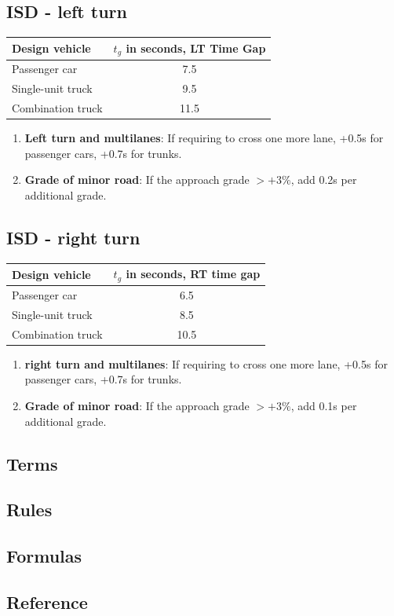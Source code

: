 \documentclass{article}
\begin{document}
  \subsection{ISD - left turn}
  \begin{tabular}{|l|c|}
    \hline
    \textbf{Design vehicle} & \textbf{$t_g$ in seconds, LT Time Gap} \\
    \hline
    Passenger car & 7.5 \\
    \hline
    Single-unit truck & 9.5 \\
    \hline
    Combination truck & 11.5 \\
    \hline
  \end{tabular}

  \begin{enumerate}
    \item \textbf{Left turn and multilanes}: If requiring to cross one more lane, +0.5s for passenger cars, +0.7s for trunks.
    \item \textbf{Grade of minor road}: If the approach grade $> +3\%$, add 0.2s per additional grade.
  \end{enumerate}

  \subsection{ISD - right turn}
  \begin{tabular}{|l|c|}
  \hline
  \textbf{Design vehicle} & \textbf{$t_g$ in seconds, RT time gap}\\
  \hline
  Passenger car & 6.5 \\
  \hline
  Single-unit truck & 8.5 \\
  \hline
  Combination truck & 10.5 \\
  \hline
  \end{tabular}

  \begin{enumerate}
    \item \textbf{right turn and multilanes}: If requiring to cross one more lane, +0.5s for passenger cars, +0.7s for trunks.
    \item \textbf{Grade of minor road}: If the approach grade $> +3\%$, add 0.1s per additional grade.
  \end{enumerate}


  \subsection{Terms}

  \subsection{Rules}

  \subsection{Formulas}

  \subsection{Reference}


\end{document}
